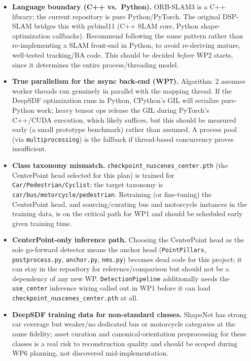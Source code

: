 \documentclass[11pt]{article}
\begin{document}
\begin{itemize}
  \item \textbf{Language boundary (C++ vs.\ Python).} ORB-SLAM3 is a C++ library; the current repository is pure Python/PyTorch. The original DSP-SLAM bridges this with pybind11 (C++ SLAM core, Python shape-optimization callbacks). Recommend following the same pattern rather than re-implementing a SLAM front-end in Python, to avoid re-deriving mature, well-tested tracking/BA code. This should be decided \emph{before} WP2 starts, since it determines the entire process/threading model.
  \item \textbf{True parallelism for the async back-end (WP7).} Algorithm~2 assumes worker threads run genuinely in parallel with the mapping thread. If the DeepSDF optimization runs in Python, CPython's GIL will serialize pure-Python work; heavy tensor ops release the GIL during PyTorch's C++/CUDA execution, which likely suffices, but this should be measured early (a small prototype benchmark) rather than assumed. A process pool (via \texttt{multiprocessing}) is the fallback if thread-based concurrency proves insufficient.
  \item \textbf{Class taxonomy mismatch.} \texttt{checkpoint\_nuscenes\_center.pth} (the CenterPoint head selected for this plan) is trained for \texttt{Car/Pedestrian/Cyclist}; the target taxonomy is \texttt{car/bus/motorcycle/pedestrian}. Retraining (or fine-tuning) the CenterPoint head, and sourcing/curating bus and motorcycle instances in the training data, is on the critical path for WP1 and should be scheduled early given training time.
  \item \textbf{CenterPoint-only inference path.} Choosing the CenterPoint head as the sole go-forward detector means the anchor head (\texttt{PointPillars}, \texttt{postprocess.py}, \texttt{anchor.py}, \texttt{nms.py}) becomes dead code for this project; it can stay in the repository for reference/comparison but should not be a dependency of any new WP. \texttt{DetectionPipeline} additionally needs the \texttt{use\_center} inference wiring called out in WP1 before it can load \texttt{checkpoint\_nuscenes\_center.pth} at all.
  \item \textbf{DeepSDF training data for non-standard classes.} ShapeNet has strong car coverage but weaker/no dedicated bus or motorcycle categories at the same fidelity; asset curation and canonical-orientation preprocessing for these classes is a real risk to reconstruction quality and should be scoped during WP6 planning, not discovered mid-implementation.

\end{itemize}
\end{document}

